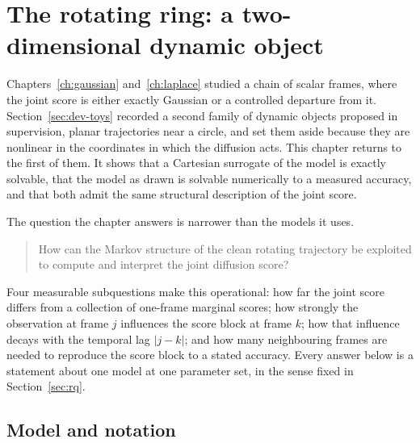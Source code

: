 %

\chapter{The rotating ring: a two-dimensional dynamic object}
\label{ch:ring}

Chapters~\ref{ch:gaussian} and~\ref{ch:laplace} studied a chain of scalar
frames, where the joint score is either exactly Gaussian or a controlled
departure from it. Section~\ref{sec:dev-toys} recorded a second family of
dynamic objects proposed in supervision, planar trajectories near a circle,
and set them aside because they are nonlinear in the coordinates in which the
diffusion acts. This chapter returns to the first of them. It shows that a
Cartesian surrogate of the model is exactly solvable, that the model as drawn
is solvable numerically to a measured accuracy, and that both admit the same
structural description of the joint score.

The question the chapter answers is narrower than the models it uses.

\begin{quote}
How can the Markov structure of the clean rotating trajectory be exploited to
compute and interpret the joint diffusion score?
\end{quote}

Four measurable subquestions make this operational: how far the joint score
differs from a collection of one-frame marginal scores; how strongly the
observation at frame $j$ influences the score block at frame $k$; how that
influence decays with the temporal lag $|j-k|$; and how many neighbouring
frames are needed to reproduce the score block to a stated accuracy. Every
answer below is a statement about one model at one parameter set, in the sense
fixed in Section~\ref{sec:rq}.

\section{Model and notation}\label{sec:ring-model}

